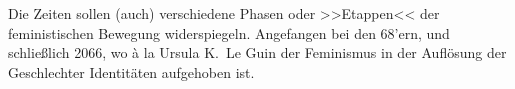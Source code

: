Die Zeiten sollen (auch) verschiedene Phasen oder >>Etappen<< der feministischen
Bewegung widerspiegeln. Angefangen bei den 68’ern, und schließlich 2066, wo à la
Ursula K.~Le Guin der Feminismus in der Auflösung der Geschlechter Identitäten
aufgehoben ist.
